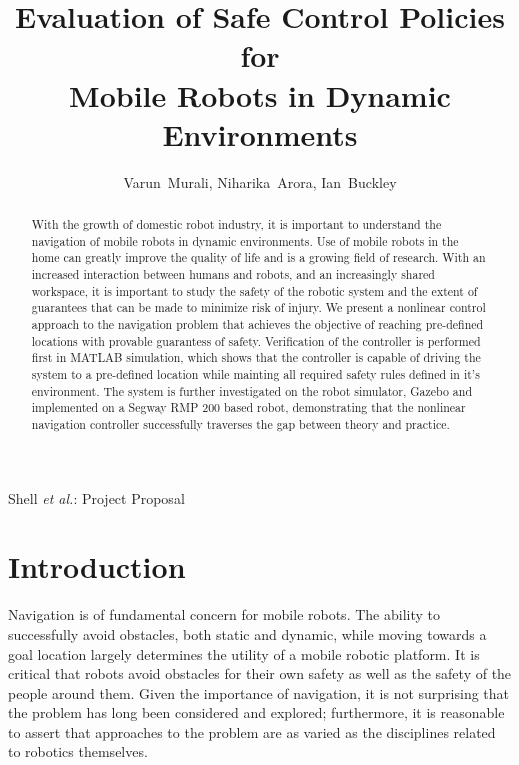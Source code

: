 \documentclass[journal]{IEEEconf}
\begin{document}
\title{Evaluation of Safe Control Policies for \\Mobile Robots in Dynamic Environments }
\author{Varun~Murali, Niharika~Arora, Ian~Buckley}
{Shell \MakeLowercase{\textit{et al.}}: Project Proposal}
\maketitle

\begin{abstract}
With the growth of domestic robot industry, it is important to understand the navigation of mobile robots in dynamic environments. Use of mobile robots in the home can greatly improve the quality of life and is a growing field of research. With an increased interaction between humans and robots, and an increasingly shared workspace, it is important to study the safety of the robotic system and the extent of guarantees that can be made to minimize risk of injury. We present a nonlinear control approach to the navigation problem that achieves the objective of reaching pre-defined locations with provable guarantess of safety. Verification of the controller is performed first in MATLAB simulation, which shows that the controller is capable of driving the system to a pre-defined location while mainting all required safety rules defined in it's environment. The system is further investigated on the robot simulator, Gazebo and implemented on a Segway RMP 200 based robot, demonstrating that the nonlinear navigation controller successfully traverses the gap between theory and practice. 
\end{abstract}

\section{Introduction}
Navigation is of fundamental concern for mobile robots. The ability to successfully avoid obstacles, both static and dynamic, while moving towards a goal location largely determines the utility of a mobile robotic platform. It is critical that robots avoid obstacles for their own safety as well as the safety of the people around them. Given the importance of navigation, it is not surprising that the problem has long been considered and explored; furthermore, it is reasonable to assert that approaches to the problem are as varied as the disciplines related to robotics themselves.  
\end{document}
